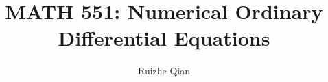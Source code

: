 \documentclass[12pt]{amsart}
\title{MATH 551: Numerical Ordinary Differential Equations}
\author{Ruizhe Qian}
\date{}
\theoremstyle{plain}
\theoremstyle{remark}
\begin{document}
\onehalfspacing
\maketitle

\tableofcontents





















\end{document}
